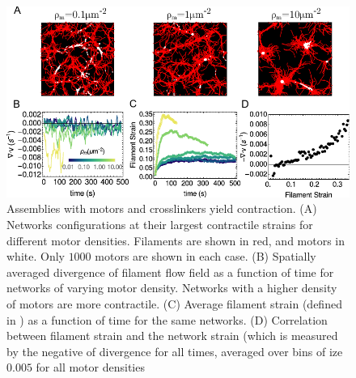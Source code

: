 \documentclass[12pt]{article}
\begin{document}
\begin{figure}[H] 
  \centering
  \includegraphics[scale=1.2]{figs/divergence/div_fig.pdf}
  \caption{%
  \label{fig:contract}%
  Assemblies with motors and crosslinkers yield contraction.
  (A) Networks configurations at their largest contractile strains for different
  motor densities. Filaments are shown in red, and motors in white. Only $1000$
  motors are shown in each case.
  (B) Spatially averaged divergence of filament flow field as a function of time
  for networks of varying motor density. Networks with a higher density of
  motors are more contractile. 
  (C) Average filament strain (defined in ) as a function
  of time for the same networks. 
  (D) Correlation between filament strain and the network strain (which is
  measured by the negative of divergence for all times, averaged over bins of 
  ize $0.005$ for all motor densities
 } 
\end{figure}  
\end{document}
